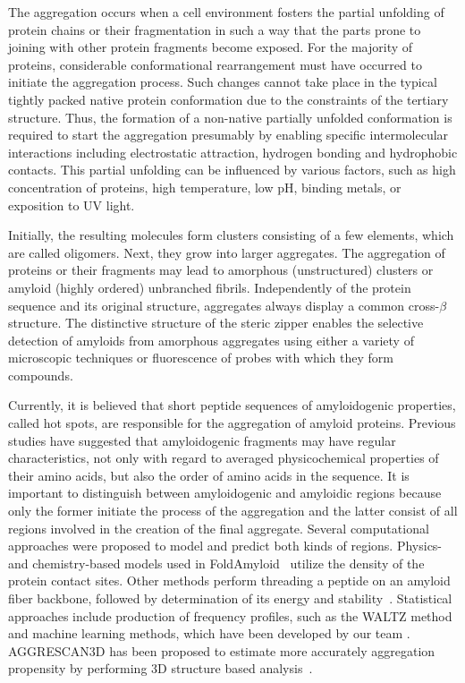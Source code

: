 \documentclass[a4,center,fleqn]{NAR}
\begin{document}
  The aggregation occurs when a cell environment fosters the partial unfolding 
of protein chains or their fragmentation in such a way that the parts prone to 
joining with other protein fragments become exposed. For the majority of proteins, 
considerable conformational rearrangement must have occurred to initiate the 
aggregation process. Such changes cannot take place in the typical tightly 
packed native protein conformation due to the constraints of the tertiary 
structure. Thus, the formation of a non-native partially unfolded conformation is 
required to start the aggregation presumably by enabling specific intermolecular interactions including electrostatic attraction, hydrogen bonding and hydrophobic contacts. This partial unfolding can be influenced by various factors, such as high 
concentration of proteins, high temperature, low pH, binding metals, or exposition to UV 
light.

  Initially, the resulting molecules form clusters consisting of a few 
elements, which are called oligomers. Next, they grow into larger aggregates. 
The aggregation of proteins or their fragments may lead to amorphous (unstructured) 
clusters or amyloid (highly ordered) unbranched fibrils. Independently of the 
protein sequence and its original structure, aggregates always display a common 
cross-$\beta$ structure. The distinctive structure of the steric zipper enables 
the selective detection of amyloids from amorphous aggregates using either a 
variety of microscopic techniques or fluorescence of probes with which they 
form compounds.

    Currently, it is believed that short peptide sequences of amyloidogenic 
properties, called hot spots, are responsible for the aggregation of amyloid 
proteins. Previous studies have suggested that amyloidogenic fragments may 
have regular characteristics, not only with regard to averaged physicochemical 
properties of their amino acids, but also the order of amino acids in the 
sequence. 
%
%
%
It is important to distinguish between amyloidogenic and amyloidic 
regions because only the former initiate the process of the aggregation and the latter consist of all regions involved in the creation of the final aggregate. Several computational approaches were proposed to model and predict both kinds of regions. Physics- and chemistry-based models used in  FoldAmyloid~\citep{garbuzynskiy_foldamyloid:_2010} utilize the density of the protein contact sites. Other methods perform threading a peptide on an amyloid fiber backbone, followed by determination of 
its energy and stability~\citep{goldschmidt_identifying_2010, 
bryan_stitcher:_2012, odonnell_method_2011}. Statistical approaches include 
production of frequency profiles, such as the WALTZ method 
\citep{beerten_waltz-db:_2015} and machine learning methods, which have been 
developed by our team \citep{stanislawski_machine_2013, gasior_fish_2014}. 
AGGRESCAN3D has been proposed to estimate more accurately aggregation 
propensity by performing 3D structure based analysis~\citep{zambrano_aggrescan3d_2015}. 
\end{document}

